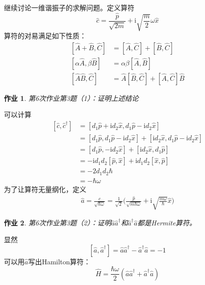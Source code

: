\documentclass[12pt]{article}
\newtheorem{asg}{作业}
\begin{document}
    继续讨论一维谐振子的求解问题。定义算符
    \[ \hat{c} = \frac {\hat{p}}{\sqrt{2m}} + \mathrm{i}\sqrt{\frac m2}\omega \hat{x} \]
    算符的对易满足如下性质：
    \begin{equation}\begin{aligned}
        [\hat{A}+\hat{B},\hat{C}] &= [\hat{A},\hat{C}]+[\hat{B},\hat{C}]\\
        [\alpha \hat{A}, \beta \hat{B}] &= \alpha \beta [\hat{A},\hat{B}]\\
        [\hat{A}\hat{B},\hat{C}] &= \hat{A}[\hat{B},\hat{C}] + [\hat{A},\hat{C}]\hat{B}
    \end{aligned}\end{equation}
    \begin{asg}
        第6次作业第3题（1）：证明上述结论
    \end{asg}
    可以计算
    \begin{equation}\begin{aligned}
        [\hat{c},\hat{c}^\dagger] &= [d_1\hat{p} +\mathrm{i}d_2\hat{x}, d_1\hat{p} - \mathrm{i}d_2\hat{x}]\\
        &= [d_1\hat{p}, d_1\hat{p} - \mathrm{i}d_2\hat{x}] + [\mathrm{i}d_2\hat{x}, d_1\hat{p} - \mathrm{i}d_2\hat{x}]\\
        &= [d_1\hat{p}, -\mathrm{i}d_2\hat{x}] + [\mathrm{i}d_2\hat{x}, d_1\hat{p}]\\
        &= -\mathrm{i}d_1d_2[\hat{p},\hat{x}] + \mathrm{i}d_1d_2[\hat{x},\hat{p}]\\
        &= -2d_1d_2\hbar\\
        &= -\hbar \omega
    \end{aligned}\end{equation}
    为了让算符无量纲化，定义
    \begin{equation}\begin{aligned}
        \hat{a} = \frac {\hat{c}}{\sqrt{\hbar \omega}} =\frac 1{\sqrt{2}} \bigg(\frac {\hat{p}}{\sqrt{m\hbar\omega}} + \mathrm{i}\sqrt{\frac {m\omega}{\hbar}} \hat{x}\bigg)
    \end{aligned}\end{equation}
    \begin{asg}
        第6次作业第3题（2）：证明$\hat{a}\hat{a}^\dagger$和$\hat{a}^\dagger\hat{a}$都是Hermite算符。
    \end{asg}
    显然
    \[ [\hat{a},\hat{a}^\dagger] = \hat{a}\hat{a}^\dagger - \hat{a}^\dagger \hat{a} =  -1 \]
    可以用$\hat{a}$写出Hamilton算符：
    \[ \hat{H} = \frac {\hbar \omega}2 (\hat{a}\hat{a}^\dagger + \hat{a}^\dagger \hat{a}) \]
\end{document}
